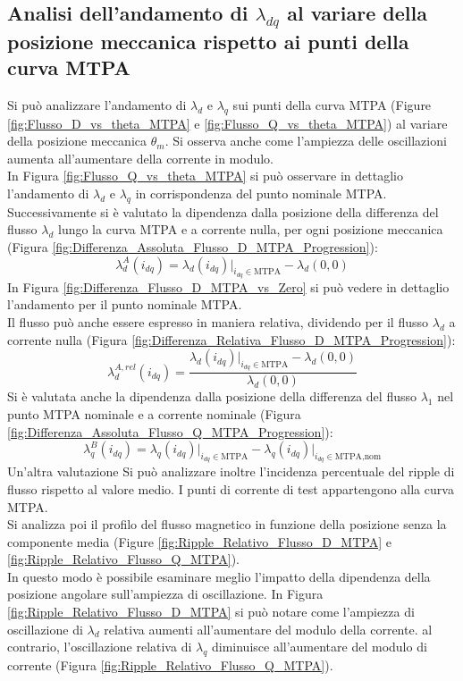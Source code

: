 \subsection{Analisi dell'andamento di $\lambda_{dq}$ al variare della posizione meccanica rispetto ai punti della curva MTPA}
Si può analizzare l'andamento di $\lambda_d$ e $\lambda_q$ sui punti della curva MTPA (Figure \ref{fig:Flusso_D_vs_theta_MTPA} e \ref{fig:Flusso_Q_vs_theta_MTPA}) al variare della posizione meccanica $\theta_m$. Si osserva anche come l'ampiezza delle oscillazioni aumenta all'aumentare della corrente in modulo.\\
In Figura \ref{fig:Flusso_Q_vs_theta_MTPA} si può osservare in dettaglio l'andamento di $\lambda_d$ e $\lambda_q$ in corrispondenza del punto nominale MTPA.
Successivamente si è valutato la dipendenza dalla posizione della differenza del flusso $\lambda_d$ lungo la curva MTPA e a corrente nulla, per ogni posizione meccanica (Figura \ref{fig:Differenza_Assoluta_Flusso_D_MTPA_Progression}):
\begin{equation}
   \lambda_d^A(i_{dq}) = \lambda_d({i_{dq}})\Big|_{{i_{dq}}\in \text{MTPA}}-\lambda_d(0,0)
\end{equation}
In Figura \ref{fig:Differenza_Flusso_D_MTPA_vs_Zero} si può vedere in dettaglio l'andamento per il punto nominale MTPA.\\
Il flusso può anche essere espresso in maniera relativa, dividendo per il flusso $\lambda_d$ a corrente nulla (Figura \ref{fig:Differenza_Relativa_Flusso_D_MTPA_Progression}):
\begin{equation}
   \lambda_d^{A,rel}(i_{dq}) = \frac{\lambda_d({i_{dq}})\Big|_{{i_{dq}}\in \text{MTPA}}-\lambda_d(0,0)}{\lambda_d(0,0)}
\end{equation}
Si è valutata anche la dipendenza dalla posizione della differenza del flusso $\lambda_1$ nel punto MTPA nominale e a corrente nominale (Figura \ref{fig:Differenza_Assoluta_Flusso_Q_MTPA_Progression}):
\begin{equation}
    \lambda_q^B(i_{dq})=\lambda_q({i_{dq}})\Big|_{{i_{dq}}\in \text{MTPA}}-\lambda_q({i_{dq}})\Big|_{{i_{dq}}\in \text{MTPA,nom}}
\end{equation}
Un'altra valutazione
Si può analizzare inoltre l'incidenza percentuale del ripple di flusso rispetto al  valore medio. I punti di corrente di test appartengono alla curva MTPA.\\
Si analizza poi il profilo del flusso magnetico in funzione della posizione senza la componente media (Figure \ref{fig:Ripple_Relativo_Flusso_D_MTPA} e \ref{fig:Ripple_Relativo_Flusso_Q_MTPA}).\\ In questo modo è possibile esaminare meglio l'impatto della dipendenza della posizione angolare sull'ampiezza di oscillazione.
In Figura \ref{fig:Ripple_Relativo_Flusso_D_MTPA} si può notare come l'ampiezza di oscillazione di $\lambda_d$ relativa aumenti all'aumentare del modulo della corrente. al contrario, l'oscillazione relativa di $\lambda_q$ diminuisce all'aumentare del modulo di corrente (Figura \ref{fig:Ripple_Relativo_Flusso_Q_MTPA}).


